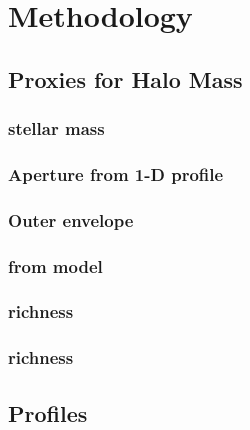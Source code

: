 \documentclass[a4paper,fleqn,usenatbib]{mnras}
\begin{document}
\section{Methodology}
	\label{sec:method}


\subsection{Proxies for Halo Mass}
	\label{sec:proxies}

\subsubsection{\cmodel{} stellar mass}
	\label{sec:mcmodel}

\subsubsection{Aperture \mstar{} from 1-D profile}
	\label{sec:maper}

\subsubsection{Outer envelope \mstar{}}
	\label{sec:menvelope}

\subsubsection{\mvir{} from \asap{} model}
	\label{sec:masap}

\subsubsection{\redm{} richness}
	\label{sec:redmapper}

\subsubsection{\camira{} richness}
	\label{sec:camira}

    
\subsection{\dsigma{} Profiles}
    \label{sec:dsigma}   
    
\end{document}
